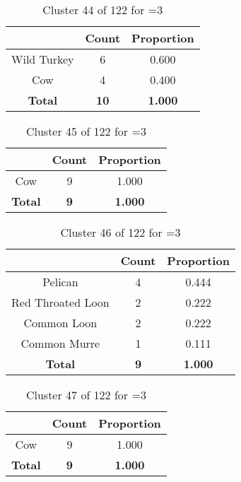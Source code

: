 \begin{table}[ht!]
\centering
\begin{tabular}{|c|c|c|}
\hline
\bf \Spec{} &\bf Count &\bf Proportion\\ \hline \hline
Wild Turkey & 6 & 0.600\\ \hline
Cow & 4 & 0.400\\ \hline
\hline
\bf Total & \bf 10 & \bf 1.000\\ \hline
\end{tabular}
\label{tab:cluster:44:3}
\caption{Cluster 44 of 122 for \minneigh{}=3}
\end{table}

\begin{table}[ht!]
\centering
\begin{tabular}{|c|c|c|}
\hline
\bf \Spec{} &\bf Count &\bf Proportion\\ \hline \hline
Cow & 9 & 1.000\\ \hline
\hline
\bf Total & \bf 9 & \bf 1.000\\ \hline
\end{tabular}
\label{tab:cluster:45:3}
\caption{Cluster 45 of 122 for \minneigh{}=3}
\end{table}

\begin{table}[ht!]
\centering
\begin{tabular}{|c|c|c|}
\hline
\bf \Spec{} &\bf Count &\bf Proportion\\ \hline \hline
Pelican & 4 & 0.444\\ \hline
Red Throated Loon & 2 & 0.222\\ \hline
Common Loon & 2 & 0.222\\ \hline
Common Murre & 1 & 0.111\\ \hline
\hline
\bf Total & \bf 9 & \bf 1.000\\ \hline
\end{tabular}
\label{tab:cluster:46:3}
\caption{Cluster 46 of 122 for \minneigh{}=3}
\end{table}

\begin{table}[ht!]
\centering
\begin{tabular}{|c|c|c|}
\hline
\bf \Spec{} &\bf Count &\bf Proportion\\ \hline \hline
Cow & 9 & 1.000\\ \hline
\hline
\bf Total & \bf 9 & \bf 1.000\\ \hline
\end{tabular}
\label{tab:cluster:47:3}
\caption{Cluster 47 of 122 for \minneigh{}=3}
\end{table}

